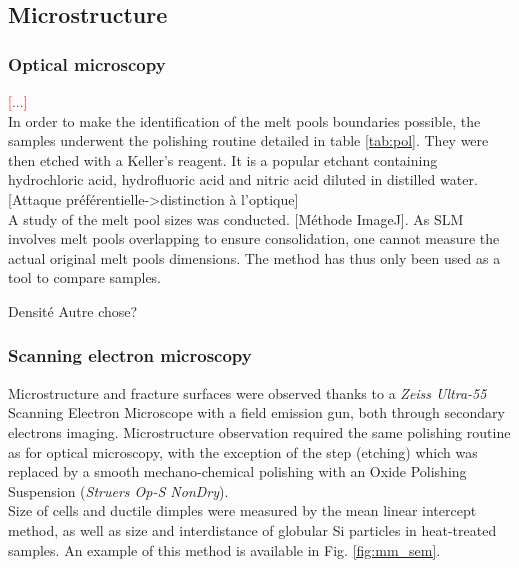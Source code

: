 \subsection{Microstructure}

\subsubsection{Optical microscopy}
\label{MMOM}

\textcolor{red}{[...]}\\

In order to make the identification of the melt pools boundaries possible, the samples underwent the polishing routine detailed in table \ref{tab:pol}. They were then etched with	a Keller's reagent. It is a popular etchant containing hydrochloric acid, hydrofluoric acid and nitric acid diluted in distilled water. [Attaque préférentielle->distinction à l'optique] \\

A study of the melt pool sizes was conducted. [Méthode ImageJ]. As SLM involves melt pools overlapping to ensure consolidation, one cannot measure the actual original melt pools dimensions. The method has thus only been used as a tool to compare samples.

Densité
Autre chose?

\subsubsection{Scanning electron microscopy}

Microstructure and fracture surfaces were observed thanks to a \textit{Zeiss Ultra-55} Scanning Electron Microscope with a field emission gun, both through secondary electrons imaging. Microstructure observation required the same polishing routine as for optical microscopy, with the exception of the step (etching) which was replaced by a smooth mechano-chemical polishing with an Oxide Polishing Suspension (\textit{Struers Op-S NonDry}).\\

Size of cells and ductile dimples were measured by the mean linear intercept method, as well as size and interdistance of globular Si particles in heat-treated samples. An example of this method is available in Fig. \ref{fig:mm_sem}.

